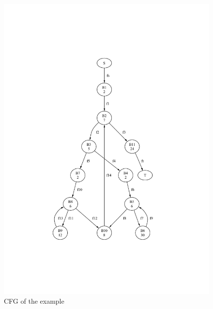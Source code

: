 \begin{figure}[t]
    \centering
    \includegraphics[scale=0.5]{wcet/loop}
    \caption{CFG of the example}
    \label{fig:cfg}
\end{figure}



